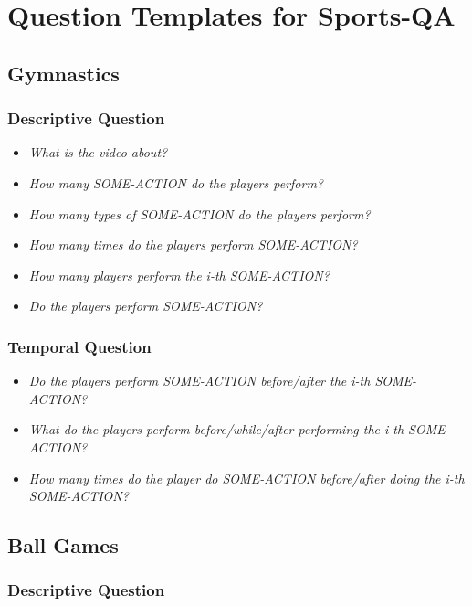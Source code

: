\section*{Question Templates for Sports-QA}

\subsection*{\centering Gymnastics}

\subsubsection*{Descriptive Question}
\begin{itemize}
    \item \textit{What is the video about?}
 \item \textit{How many SOME-ACTION do the players perform?}
 \item \textit{How many types of SOME-ACTION do the players perform?}
 \item \textit{How many times do the players perform SOME-ACTION?}
 \item \textit{How many players perform the i-th SOME-ACTION?}
 \item \textit{Do the players perform SOME-ACTION?}
\end{itemize}

\subsubsection*{Temporal Question}
\begin{itemize}
 \item \textit{Do the players perform SOME-ACTION before/after the i-th SOME-ACTION?}
 \item \textit{What do the players perform before/while/after performing the i-th SOME-ACTION?}
 \item \textit{How many times do the player do SOME-ACTION before/after doing the i-th SOME-ACTION?}
\end{itemize}

\subsection*{\centering Ball Games}
\subsubsection*{Descriptive Question}

